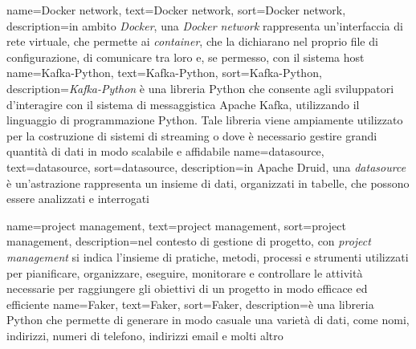 {
    name={Docker network},
    text=Docker network,
    sort=Docker network,
    description={in ambito \textit{Docker}, una \textit{Docker network} rappresenta un'interfaccia di rete virtuale, che permette ai \textit{container}, che la dichiarano nel proprio file di configurazione, di comunicare tra loro e, se permesso, con il sistema host}
}
{
    name={Kafka-Python},
    text=Kafka-Python,
    sort=Kafka-Python,
    description={\textit{Kafka-Python} è una libreria Python che consente agli sviluppatori d'interagire con il sistema di messaggistica Apache Kafka, utilizzando il linguaggio di programmazione Python. Tale libreria viene ampiamente utilizzato per la costruzione di sistemi di streaming o dove è necessario gestire grandi quantità di dati in modo scalabile e affidabile}
}
{
    name={datasource},
    text=datasource,
    sort=datasource,
    description={in Apache Druid, una \textit{datasource} è un'astrazione rappresenta un insieme di dati, organizzati in tabelle, che possono essere analizzati e interrogati}
}

{
    name={project management},
    text=project management,
    sort=project management,
    description={nel contesto di gestione di progetto, con \textit{project management} si indica l'insieme di pratiche, metodi, processi e strumenti utilizzati per pianificare, organizzare, eseguire, monitorare e controllare le attività necessarie per raggiungere gli obiettivi di un progetto in modo efficace ed efficiente}
}
{
    name={Faker},
    text=Faker,
    sort=Faker,
    description={è una libreria Python che permette di generare in modo casuale una varietà di dati, come nomi, indirizzi, numeri di telefono, indirizzi email e molti altro}
}